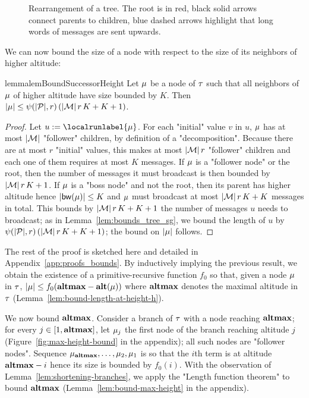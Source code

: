 \begin{figure}[t]
	
	\caption{Rearrangement of a tree. The root is in red, black solid arrows connect parents to children, blue dashed arrows highlight that long words of messages are sent upwards.}
	\label{fig:rearrange-tree}
\end{figure}

We can now bound the size of a node with respect to the size of its neighbors of higher altitude:

\begin{restatable}{lemma}{lemBoundSuccessorHeight}
	\label{lem:bound-successor-height}
	Let $\mu$ be a node of $\tau$ such that all neighbors of $\mu$ of higher altitude have size bounded by $K$.
	Then $|\mu| \leq \psi(|\mathcal{P}|, r) \, (|\mathcal{M}| \, r \, K + K + 1)$. 
\end{restatable}
\begin{proof}
	Let $u := \localrunlabel{\node}$. For each "initial" value $v$ in $u$, $\mu$ has at most $|\mathcal{M}|$ "follower" children, by definition of a "decomposition".
	Because there are at most $r$ "initial" values, this makes at most $|\mathcal{M}| \, r$ "follower" children and each one of them requires at most $K$ messages. If $\mu$ is a "follower node" or the root, then the number of messages it must broadcast is then bounded by $|\mathcal{M}| \, r \, K +1$. If $\mu$ is a "boss node" and not the root, then its parent %
	has higher altitude hence $|\mathsf{bw}(\mu)| \leq K$ and $\mu$ must broadcast at most $|\mathcal{M}| \, r \, K + K$ messages in total.
	This bounds by $|\mathcal{M}| \, r \, K + K +1$ the number of messages $u$ needs to broadcast; as in Lemma~\ref{lem:bounds_tree_sg}, we bound the length of $u$ by $\psi(|\mathcal{P}|,r) \, (|\mathcal{M}|\, r \, K + K + 1)$; the bound on $|\mu|$ follows.
\end{proof}

The rest of the proof is sketched here and detailed in Appendix~\ref{app:proofs_bounds}. 
By inductively implying the previous result, we obtain the existence of a primitive-recursive function $f_0$ so that, given a node $\mu$ in $\tau$, $|\mu| \leq f_0(\mathbf{altmax} - \mathbf{alt}(\mu))$ where $\mathbf{altmax}$ denotes the maximal altitude in $\tau$ (Lemma~\ref{lem:bound-length-at-height-h}).

We now bound $\mathbf{altmax}$. Consider a branch of $\tau$ with a node reaching $\mathbf{altmax}$; for every $j \in [1,\mathbf{altmax}]$, let $\mu_{j}$ the first node of the branch reaching altitude $j$ (Figure~\ref{fig:max-height-bound} in the appendix); all such nodes are "follower nodes". Sequence $\mu_{\mathbf{altmax}}, \dots, \mu_2, \mu_1$ is so that the $i$th term is at altitude $\mathbf{altmax}-i$ hence its size is bounded by $f_0(i)$. With the observation of Lemma~\ref{lem:shortening-branches}, we apply the "Length function theorem" to bound $\mathbf{altmax}$ (Lemma~\ref{lem:bound-max-height} in the appendix).


